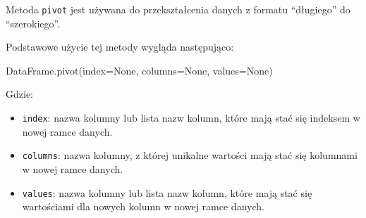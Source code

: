 \documentclass[
  polish,
  letterpaper,
  DIV=11,
  numbers=noendperiod]{scrreprt}
\newenvironment{Shaded}{\begin{snugshade}}{\end{snugshade}}
\newcommand{\NormalTok}[1]{\textcolor[rgb]{0.00,0.23,0.31}{#1}}
\newcommand{\OperatorTok}[1]{\textcolor[rgb]{0.37,0.37,0.37}{#1}}
\newcommand{\VariableTok}[1]{\textcolor[rgb]{0.07,0.07,0.07}{#1}}
\providecommand{\tightlist}{%
  \setlength{\itemsep}{0pt}\setlength{\parskip}{0pt}}
\begin{document}
Metoda \texttt{pivot} jest używana do przekształcenia danych z formatu
``długiego'' do ``szerokiego''.

Podstawowe użycie tej metody wygląda następująco:

\begin{Shaded}
\begin{Highlighting}[]
\NormalTok{DataFrame.pivot(index}\OperatorTok{=}\VariableTok{None}\NormalTok{, columns}\OperatorTok{=}\VariableTok{None}\NormalTok{, values}\OperatorTok{=}\VariableTok{None}\NormalTok{)}
\end{Highlighting}
\end{Shaded}

Gdzie:

\begin{itemize}
\tightlist
\item
  \texttt{index}: nazwa kolumny lub lista nazw kolumn, które mają stać
  się indeksem w nowej ramce danych.
\item
  \texttt{columns}: nazwa kolumny, z której unikalne wartości mają stać
  się kolumnami w nowej ramce danych.
\item
  \texttt{values}: nazwa kolumny lub lista nazw kolumn, które mają stać
  się wartościami dla nowych kolumn w nowej ramce danych.
\end{itemize}
\end{document}
